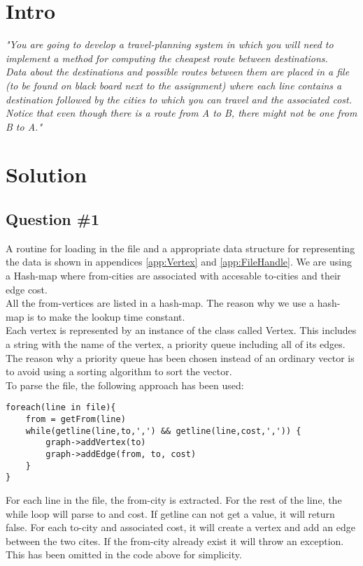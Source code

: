 \section{Intro}
\label{sec:intro}
\textit{"You are going to develop a travel-planning system in which you will need to implement a method for computing the cheapest route between destinations. \\
Data about the destinations and possible routes between them are placed in a file (to be found on black board next to the assignment) where each line contains a destination followed by the cities to which you can travel and the associated cost. \\
Notice that even though there is a route from A to B, there might not be one from B to A."}


\section{Solution}
\subsection{Question \#1}
A routine for loading in the file and a appropriate data structure for representing the data is shown in appendices  \ref{app:Vertex} and \ref{app:FileHandle}. We are using a Hash-map where from-cities are associated with accesable to-cities and their edge cost.\\
All the from-vertices are listed in a hash-map. The reason why we use a hash-map is to make the lookup time constant. \\
Each vertex is represented by an instance of the class called Vertex. This includes a string with the name of the vertex, a priority queue including all of its edges. The reason why a priority queue has been chosen instead of an ordinary vector is to avoid using a sorting algorithm to sort the vector.\\
To parse the file, the following approach has been used:
\bigskip
\begin{lstlisting}
foreach(line in file){
	from = getFrom(line)
	while(getline(line,to,',') && getline(line,cost,',')) {
		graph->addVertex(to)
		graph->addEdge(from, to, cost)
	}	
}
\end{lstlisting}
\bigskip
For each line in the file, the from-city is extracted. For the rest of the line, the while loop will parse to and cost. If getline can not get a value, it will return false. For each to-city and associated cost, it will create a vertex and add an edge between the two cites. If the from-city already exist it will throw an exception. This has been omitted in the code above for simplicity.


